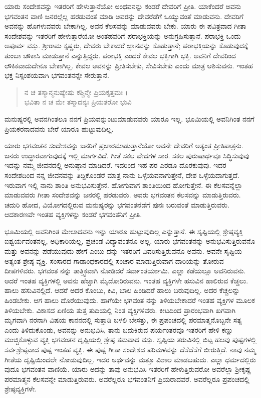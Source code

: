 ಯಾರು ಸಂದೇಶವನ್ನು ಇತರರಿಗೆ ಹೇಳುತ್ತಾನೆಯೋ ಅಂಥವನನ್ನು ಕಂಡರೆ ದೇವರಿಗೆ ಪ್ರೀತಿ. ಯಾಕೆಂದರೆ ಅವನು ಭಗವಂತನ ವಾಣಿ ಜನರಲ್ಲೆಲ್ಲ ಹರಡುವಂತೆ ಮಾಡಿ ಅವರನ್ನು ದೇವರೆಡೆಗೆ ಒಯ್ಯುವಂತೆ ಮಾಡುವನು. ದೇವರಿಗೆ ಅವನನ್ನು ಹೊಗಳುವವರು ಬೇಕಾಗಿಲ್ಲ. ಅವನ ಕೆಲಸವನ್ನು ಮಾಡುವವರು ಬೇಕು. ಯಾರು ಈ ಪವಿತ್ರವಾದ ಗೀತಾ ಸಂದೇಶವನ್ನು ಇತರರಿಗೆ ಹೇಳುತ್ತಾರೆಯೋ ಅಂತಹವರಿಗೆ ಪರಾಭಕ್ತಿಯನ್ನು ಅನುಗ್ರಹಿಸುತ್ತಾನೆ. ಪರಾಭಕ್ತಿ ಒಂದು ಅಪೂರ್ವ ವಸ್ತು. ಶ್ರೀರಾಮ ಕೃಷ್ಣರು, ದೇವರು ಬೇಕಾದರೆ ಜ್ಞಾನವನ್ನು ಕೊಡುತ್ತಾನೆ; ಪರಾಭಕ್ತಿಯನ್ನು ಕೊಡುವುದಕ್ಕೆ ತುಂಬಾ ಚೌಕಾಸಿ ಮಾಡುತ್ತಾನೆ ಎನ್ನುತ್ತಿದ್ದರು. ಪರಾಭಕ್ತಿ ಎಂದರೆ ಕೇವಲ ಭಕ್ತಿಗಾಗಿ ಭಕ್ತಿ. ಅವನಿಗೆ ದೇವರಿಂದ ಲೌಕಿಕವಾದುದೇನೂ ಬೇಕಾಗಿಲ್ಲ. ಕೇವಲ ಅವನನ್ನು ಪ್ರೀತಿಸಬೇಕು, ಸೇವಿಸಬೇಕು ಎಂದು ಮಾತ್ರ ಆಶಿಸುವನು. ಇಂತಹ ಭಕ್ತ ನಿಸ್ಸಂಶಯವಾಗಿ ಭಗವಂತನನ್ನೇ ಸೇರುತ್ತಾನೆ.

\begin{verse}
ನ ಚ ತಸ್ಮಾನ್ಮನುಷ್ಯೇಷು ಕಶ್ಚಿನ್ಮೇ ಪ್ರಿಯಕೃತ್ತಮಃ ।\\ಭವಿತಾ ನ ಚ ಮೇ ತಸ್ಮಾದನ್ಯಃ ಪ್ರಿಯತರೋ ಭುವಿ 
\end{verse}

{\small ಮನುಷ್ಯರಲ್ಲಿ ಅವನಗಿಂತಲೂ ನನಗೆ ಪ್ರಿಯವನ್ನುಂಟುಮಾಡುವವರು ಯಾರೂ ಇಲ್ಲ. ಭೂಮಿಯಲ್ಲಿ ಅವನಿಗಿಂತ ನನಗೆ ಪ್ರಿಯಕರನಾದವನು ಬೇರೆ ಯಾರೂ ಹುಟ್ಟುವುದಿಲ್ಲ.}

ಯಾರು ಭಗವಂತನ ಸಂದೇಶವನ್ನು ಜನರಿಗೆ ಪ್ರಚಾರಮಾಡುತ್ತಾನೆಯೋ ಅವನೇ ದೇವರಿಗೆ ಅತ್ಯಂತ ಪ್ರೀತಿಪಾತ್ರನು. ಜನರು ಉದ್ಧಾರವಾಗುವುದಕ್ಕೆ ಇಲ್ಲಿ ಮಾರ್ಗವಿದೆ. ಗೀತೆ ಸಕಲ ವೇದಗಳ ಸಾರ. ಸಕಲ ಪುರುಷಾರ್ಥವೂ ಸಿದ್ಧಿಸುವುವು ಇದನ್ನು ನಮ್ಮ ಜೀವನದಲ್ಲಿ ಅನುಷ್ಠಾನ ಮಾಡಿದರೆ. ಇದರಿಂದ ಇಹ ಪರ ಎರಡೂ ದೊರಕುವುವು. ಇದರ ಸಂದೇಶದಿಂದ ನನ್ನ ಜೀವನವನ್ನು ತಿದ್ದಿಕೊಂಡರೆ ಮಾತ್ರ ನಾನು ಒಳ್ಳೆಯವನಾಗುತ್ತೇನೆ, ದೇಶ ಒಳ್ಳೆಯದಾಗುತ್ತದೆ. ಇರುವಾಗ ಇಲ್ಲಿ ನಾನು ಶಾಂತಿ ಅನುಭವಿಸುತ್ತೇನೆ. ಹೋಗುವಾಗ ಶಾಂತಿಯಿಂದ ಹೋಗುತ್ತೇನೆ. ಈ ಕೆಲಸವನ್ನೆಲ್ಲಾ ಮಾಡುವವರು ಗೀತಾ ಸಂದೇಶವನ್ನು ಜನರಲ್ಲಿ ಹರಡುವರು. ಅವರು ಭಗವಂತನ ಕೆಲಸವನ್ನು ಮಾಡುತ್ತಿರುವರು. ಚದುರಿ ಹೋದ, ವಿಯೋಗದಲ್ಲಿರುವ ಮನುಷ್ಯರನ್ನು ಭಗವಂತನೆಡೆಗೆ ಪುನಃ ಬರುವಂತೆ ಮಾಡುತ್ತಿರುವರು. ಆದಕಾರಣವೇ ಇಂತಹ ವ್ಯಕ್ತಿಗಳನ್ನು ಕಂಡರೆ ಭಗವಂತನಿಗೆ ಪ್ರೀತಿ.

ಭೂಮಿಯಲ್ಲಿ ಅವನಿಗಿಂತ ಮೇಲಾದವನು ಇನ್ನು ಯಾರೂ ಹುಟ್ಟುವುದಿಲ್ಲ ಎನ್ನುತ್ತಾನೆ. ಈ ಸೃಷ್ಟಿಯಲ್ಲಿ ಶ್ರೇಷ್ಠವ್ಯಕ್ತಿ ಐಶ್ವರ್ಯವಂತನಲ್ಲ, ಅಧಿಕಾರಿಯಲ್ಲ, ಪ್ರಚಂಡ ವಿದ್ಯಾವಂತನೂ ಅಲ್ಲ. ಯಾರು ಭಗವಂತನನ್ನು ಅನುಭವಿಸುತ್ತಿರುವನೊ ಮತ್ತು ಅವನನ್ನು ಪಡೆಯುವುದು ಹೇಗೆ ಎಂಬು ದನ್ನು ಇತರರಿಗೆ ವಿವರಿಸುತ್ತಿರುವನೊ ಅವನು. ಅವನೇ ಸೃಷ್ಟಿಯ ಅತ್ಯಂತ ಶ್ರೇಷ್ಠ ವ್ಯಕ್ತಿ. ಸಂಸಾರದ ಗಾಡಾಂಧಕಾರದಲ್ಲಿ ಸಂಚಾರ ಮಾಡುತ್ತಿರುವಾಗ ದಾರಿಯನ್ನು ತೋರುವ ದೀಪಗಳಿವರು. ಭಗವಂತ ನನ್ನು ತಾತ್ತ್ವಿಕವಾಗಿ ನೋಡಿದರೆ ಸರ್ವಾಂತರ್ಯಾಮಿ. ಎಲ್ಲಾ ಕಡೆಯಲ್ಲೂ ಅವನಿರುವನು. ಆದರೆ ಇಂತಹ ವ್ಯಕ್ತಿಗಳಲ್ಲಿ ಅವನು ಹೆಚ್ಚಾಗಿ ಮೈದೋರಿರುವನು. ಇಂತಹ ವ್ಯಕ್ತಿಗಳೇ ಹಸುವಿನ ಹಾಲಿರುವ ಕೆಚ್ಚಲು. ಹಾಲು ಹಸುವಿನಲ್ಲಿದೆ. ಆದರೆ ಅದರ ಕೊಂಬು, ಕಿವಿ, ಬಾಲ ಹಿಂಡಿದರೆ ಹಾಲು ಬರುವುದಿಲ್ಲ. ಅದರ ಕೆಚ್ಚಲನ್ನು ಹಿಂಡಬೇಕು. ಆಗ ಹಾಲು ದೊರೆಯುವುದು. ಹಾಗೆಯೇ ಭಗವಂತ ನನ್ನು ತಿಳಿಯಬೇಕಾದರೆ ಇಂತಹ ವ್ಯಕ್ತಿಗಳ ಮೂಲಕ ತಿಳಿಯಬೇಕು. ವಿಕಾಸದ ಏಣಿಯ ತುತ್ತ ತುದಿಯಲ್ಲಿ ನಿಂತ ವ್ಯಕ್ತಿಗಳಿವರು. ಕೀಟದಿಂದ ಪ್ರಾರಂಭವಾಗಿ ಖಗವಾಗಿ ಮೃಗವಾಗಿ ನರನಾಗಿ ವಿಷಯ ಕಾನನದಲ್ಲಿ ಸುತ್ತಾಡಿ ಬಳಲಿ ಬೇಸತ್ತು, ಈ ಪ್ರಪಂಚದಲ್ಲಿ ಪರಮಾತ್ಮನೊಬ್ಬನೇ ಸತ್ಯ ಎಂದು ತಿಳಿದುಕೊಂಡು, ಅವನನ್ನು ಅನುಭವಿಸಿ, ತಾನು ಬದುಕಿರುವ ಪರ್ಯಂತರವೂ ಇತರರಿಗೆ ಹೇಳಿ ಕಣ್ಣು ಮುಚ್ಚಿಕೊಳ್ಳುವ ವ್ಯಕ್ತಿ ಭಗವಂತನ ದೃಷ್ಟಿಯಲ್ಲಿ ಶ್ರೇಷ್ಠ ತಮವಾದ ವಸ್ತು. ಸೃಷ್ಟಿಯ ತರುವಿನಲ್ಲಿ ಬಿಟ್ಟ ಹಲವು ಪುಷ್ಪಗಳಲ್ಲಿ ಸರ್ವಶ್ರೇಷ್ಠವಾದ ಪುಷ್ಪ ಇಂತಹ ವ್ಯಕ್ತಿ. ಈ ಪುಷ್ಪ ಗೀತಾ ಸಂದೇಶದ ಪರಿಮಳವನ್ನು ದೆಸೆದೆಸೆಗೆ ಬೀರುತ್ತಿದೆ. ನಾವು ನಮ್ಮ ಗೀತೆಯ ದೃಷ್ಟಿಯಿಂದಲೇ ನೋಡುವುದಿಲ್ಲ. ಇದರ ಅರ್ಥವನ್ನು ಮತ್ತೂ ವಿಶಾಲ ಮಾಡಬಹುದು. ಎಲ್ಲಾ ಧರ್ಮದಲ್ಲಿರು ವುದೂ ಭಗವಂತನ ವಾಣಿಯೆ. ಯಾರು ಅದನ್ನು ತಾವು ಅನುಭವಿಸಿ ಇತರರಿಗೆ ಹೇಳುತ್ತಿರುವರೋ ಅವರೆಲ್ಲಾ ಶ್ರೀಕೃಷ್ಣ ಪರಮಾತ್ಮನ ಕೆಲಸವನ್ನೇ ಮಾಡುತ್ತಿರುವರು. ಅವರೆಲ್ಲರೂ ಭಗವಂತನಿಗೆ ಪ್ರಿಯರಾದವರೆ. ಅವರೆಲ್ಲರೂ ಪ್ರಪಂಚದಲ್ಲಿ ಶ್ರೇಷ್ಠವ್ಯಕ್ತಿಗಳೇ.

